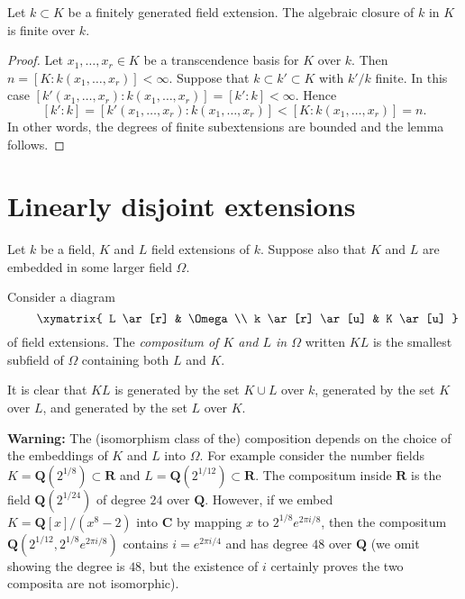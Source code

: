 \begin{lemma}
\label{lemma-algebraic-closure-in-finitely-generated}
Let $k \subset K$ be a finitely generated field extension.
The algebraic closure of $k$ in $K$ is finite over $k$.
\end{lemma}

\begin{proof}
Let $x_1, \ldots, x_r \in K$ be a transcendence basis for $K$
over $k$. Then $n = [K : k(x_1, \ldots, x_r)] < \infty$.
Suppose that $k \subset k' \subset K$ with $k'/k$ finite.
In this case
$[k'(x_1, \ldots, x_r) : k(x_1, \ldots, x_r)] = [k' : k] < \infty$.
Hence
$$
[k' : k] = [k'(x_1, \ldots, x_r) : k(x_1, \ldots, x_r)]
< [K : k(x_1, \ldots, x_r)] = n.
$$
In other words, the degrees of finite subextensions are bounded
and the lemma follows.
\end{proof}






\section{Linearly disjoint extensions}
\label{section-linearly-disjoint}

\noindent
Let $k$ be a field, $K$ and $L$ field extensions of $k$.
Suppose also that $K$ and $L$ are embedded in some larger field $\Omega$.

\begin{definition}
\label{definition-compositum}
Consider a diagram
\begin{equation}
\label{equation-inside-omega}
\vcenter{
\xymatrix{
L \ar[r] & \Omega \\
k \ar[r] \ar[u] & K \ar[u]
}
}
\end{equation}
of field extensions. The {\it compositum of $K$ and $L$ in $\Omega$}
written $KL$ is the smallest subfield of $\Omega$ containing both
$L$ and $K$.
\end{definition}

\noindent
It is clear that $KL$ is generated by the set $K \cup L$ over $k$,
generated by the set $K$ over $L$, and generated by the set $L$ over $K$.

\medskip\noindent
{\bf Warning:} The (isomorphism class of the) composition depends on
the choice of the embeddings of $K$ and $L$ into $\Omega$. For example
consider the number fields $K = \mathbf{Q}(2^{1/8}) \subset \mathbf{R}$ and
$L = \mathbf{Q}(2^{1/12}) \subset \mathbf{R}$. The compositum inside
$\mathbf{R}$ is the field $\mathbf{Q}(2^{1/24})$ of degree $24$ over
$\mathbf{Q}$. However, if we embed $K = \mathbf{Q}[x]/(x^8 - 2)$ into
$\mathbf{C}$ by mapping $x$ to $2^{1/8}e^{2\pi i/8}$, then the compositum
$\mathbf{Q}(2^{1/12}, 2^{1/8}e^{2\pi i/8})$ contains $i = e^{2\pi i/4}$ and has
degree $48$ over $\mathbf{Q}$ (we omit showing the degree is $48$, but
the existence of $i$ certainly proves the two composita are not isomorphic). 

